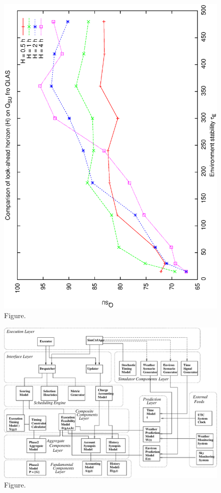 \documentclass[12pt,a4paper]{article}
\begin{document}
\begin{figure}[htbp]
 \begin{center}
  \includegraphics[scale=1.0, angle=0]{figures/qsu_hte.eps}
 \end{center}
  \caption[Figure.]
{Figure.}
\end{figure}
\clearpage
\begin{figure}[htbp]
 \begin{center}
  \includegraphics[scale=1.0, angle=0]{figures/sca.eps}
 \end{center}
  \caption[Figure.]
{Figure.}
\end{figure}
\end{document}
